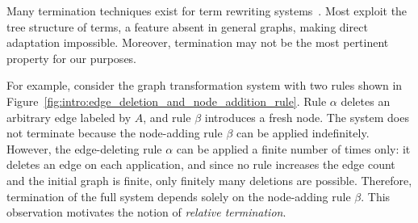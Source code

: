 Many termination techniques exist for term rewriting systems~\cite{nipkow1998term, dershowitz1982orderings, middeldorp1997simple, arts2000termination,contejean2005mechanically,urbain2004modular,contejean2011automated,giesl2014proving}.  
Most exploit the tree structure of terms, a feature absent in general graphs, making direct adaptation impossible. 
Moreover, termination may not be the most pertinent property for our purposes. 

For example, consider the graph transformation system with two rules shown in Figure~\ref{fig:intro:edge_deletion_and_node_addition_rule}. Rule $\alpha$ deletes an arbitrary edge labeled by $A$, and rule $\beta$ introduces a fresh node. The system does not terminate because the node-adding rule $\beta$ can be applied indefinitely. However, the edge-deleting rule $\alpha$ can be applied a finite number of times only: it deletes an edge on each application, and since no rule increases the edge count and the initial graph is finite, only finitely many deletions are possible. Therefore, termination of the full system depends solely on the node-adding rule $\beta$. This observation motivates the notion of \emph{relative termination}.

